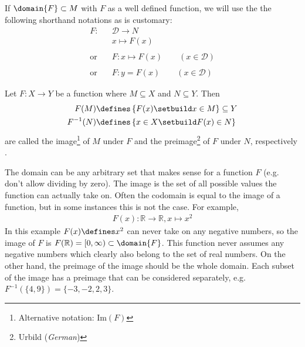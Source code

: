 \begin{flushleft}
	If $\domain{F}\subset M$ with $F$ as a well defined function, we will use the
	the following shorthand notations as is customary:
	\begin{align*}
		F:\;           & \mathcal{D} \rightarrow N                \\
		               & x\mapsto F(x)                            \\\\
		\text{or}\quad & F:x\mapsto F(x)\qquad{(x\in\mathcal{D})} \\\\
		\text{or}\quad & F:y=F(x)\qquad{(x\in\mathcal{D})}
	\end{align*}
\end{flushleft}

\begin{definition}\label{def-image-preimage}
	Let $F : X \rightarrow Y$ be a function where $M\subseteq X$ and $N \subseteq Y$.
	Then
	\begin{align}
		F(M)      & \defines \left\{F(x) \setbuild x \in M \right\}\subseteq Y \label{eq-image} \\
		F^{-1}(N) & \defines \left\{x \in X \setbuild F(x) \in N \right\}\label{eq-preimage}
	\end{align}
	are called the image\footnote{Alternative notation: $\text{Im}(F)$} of $M$
	under $F$ and the preimage\footnote{Urbild (\textit{German})} of $F$ under $N$, respectively
	\cite[p.16]{liesenMehrmann2015}.
\end{definition}

\begin{rem}
	The domain can be any arbitrary set that makes sense for a function $F$ (e.g.
	don't allow dividing by zero). The image is the set of all possible values the
	function can actually take on. Often the codomain is equal to the image of a
	function, but in some instances this is not the case. For example,
	\begin{align*}
		F(x):\mathbb{R}\rightarrow\mathbb{R},x\mapsto x^2
	\end{align*}
	In this example $F(x)\defines x^2$ can never take on any negative numbers,
	so the image of $F$ is $F(\mathbb{R})=[0,\infty)\subset\domain{F}$. This
	function never assumes any negative numbers which clearly also belong to the
	set of real numbers. On the other hand, the preimage of the image should be
	the whole domain. Each subset of the image has a preimage that can be considered
	separately, e.g. $ F^{-1}(\{4,9\})=\{-3,-2,2,3\}$.
\end{rem}

